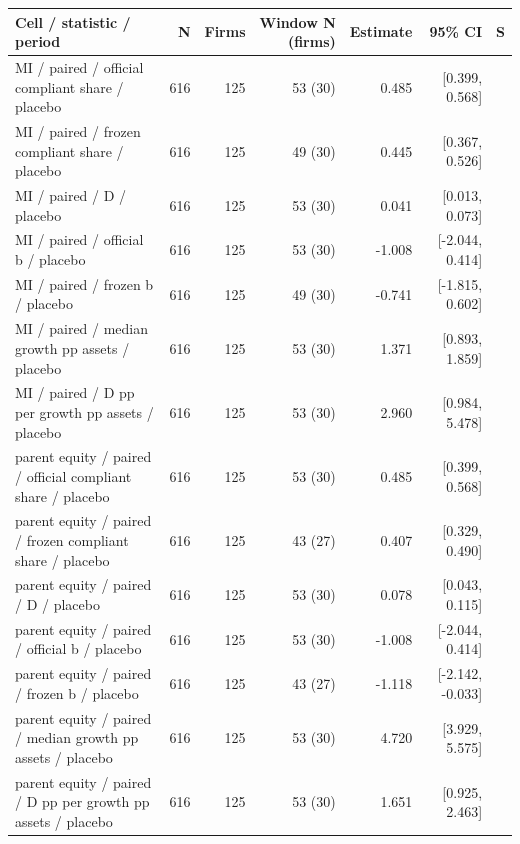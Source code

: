\begin{threeparttable}
\begin{tabular}{p{5.7cm}rrrrrl}
\toprule
Cell / statistic / period & N & Firms & Window N (firms) & Estimate & 95\% CI & S \\
\midrule
MI / paired / official compliant share / placebo & 616 & 125 & 53 (30) & 0.485 & [0.399, 0.568] &  \\
MI / paired / frozen compliant share / placebo & 616 & 125 & 49 (30) & 0.445 & [0.367, 0.526] &  \\
MI / paired / D / placebo & 616 & 125 & 53 (30) & 0.041 & [0.013, 0.073] &  \\
MI / paired / official b / placebo & 616 & 125 & 53 (30) & -1.008 & [-2.044, 0.414] &  \\
MI / paired / frozen b / placebo & 616 & 125 & 49 (30) & -0.741 & [-1.815, 0.602] &  \\
MI / paired / median growth pp assets / placebo & 616 & 125 & 53 (30) & 1.371 & [0.893, 1.859] &  \\
MI / paired / D pp per growth pp assets / placebo & 616 & 125 & 53 (30) & 2.960 & [0.984, 5.478] &  \\
parent equity / paired / official compliant share / placebo & 616 & 125 & 53 (30) & 0.485 & [0.399, 0.568] &  \\
parent equity / paired / frozen compliant share / placebo & 616 & 125 & 43 (27) & 0.407 & [0.329, 0.490] &  \\
parent equity / paired / D / placebo & 616 & 125 & 53 (30) & 0.078 & [0.043, 0.115] &  \\
parent equity / paired / official b / placebo & 616 & 125 & 53 (30) & -1.008 & [-2.044, 0.414] &  \\
parent equity / paired / frozen b / placebo & 616 & 125 & 43 (27) & -1.118 & [-2.142, -0.033] &  \\
parent equity / paired / median growth pp assets / placebo & 616 & 125 & 53 (30) & 4.720 & [3.929, 5.575] &  \\
parent equity / paired / D pp per growth pp assets / placebo & 616 & 125 & 53 (30) & 1.651 & [0.925, 2.463] &  \\
\bottomrule
\end{tabular}
\begin{tablenotes}[flushleft]\footnotesize

\end{tablenotes}
\end{threeparttable}
